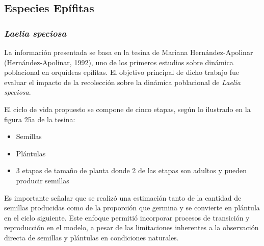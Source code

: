 \documentclass[
  12pt,
  letterpaper,
]{book}
\providecommand{\tightlist}{%
  \setlength{\itemsep}{0pt}\setlength{\parskip}{0pt}}\usepackage{longtable,booktabs,array}
\begin{document}
\subsection{Especies Epífitas}\label{especies-epuxedfitas}

\subsubsection{\texorpdfstring{\emph{Laelia
speciosa}}{Laelia speciosa}}\label{laelia-speciosa}

La información presentada se basa en la tesina de Mariana
Hernández-Apolinar (Hernández-Apolinar, 1992), uno de los primeros
estudios sobre dinámica poblacional en orquídeas epífitas. El objetivo
principal de dicho trabajo fue evaluar el impacto de la recolección
sobre la dinámica poblacional de \emph{Laelia speciosa}.

El ciclo de vida propuesto se compone de cinco etapas, según lo
ilustrado en la figura 25a de la tesina:

\begin{itemize}
\tightlist
\item
  Semillas
\item
  Plántulas
\item
  3 etapas de tamaño de planta donde 2 de las etapas son adultos y
  pueden producir semillas
\end{itemize}

Es importante señalar que se realizó una estimación tanto de la cantidad
de semillas producidas como de la proporción que germina y se convierte
en plántula en el ciclo siguiente. Este enfoque permitió incorporar
procesos de transición y reproducción en el modelo, a pesar de las
limitaciones inherentes a la observación directa de semillas y plántulas
en condiciones naturales.
\end{document}
